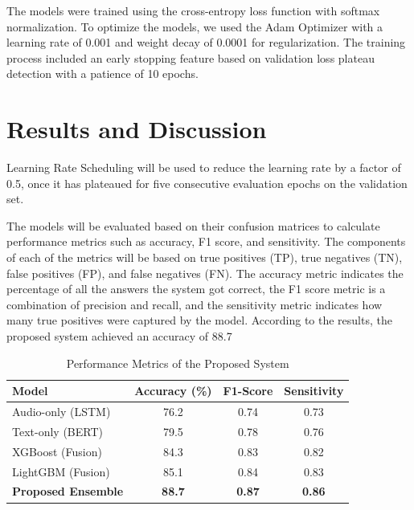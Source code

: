 \documentclass[conference]{IEEEtran}
\begin{document}
The models were trained using the cross-entropy loss function with softmax normalization. To optimize the models, we used the Adam Optimizer\cite{kingma2014adam} with a learning rate of 0.001 and weight decay of 0.0001 for regularization. The training process included an early stopping feature based on validation loss plateau detection with a patience of 10 epochs.

\section{Results and Discussion}

Learning Rate Scheduling will be used to reduce the learning rate by a factor of 0.5, once it has plateaued for five consecutive evaluation epochs on the validation set.

The models will be evaluated based on their confusion matrices to calculate performance metrics such as accuracy, F1 score, and sensitivity. The components of each of the metrics will be based on true positives (TP), true negatives (TN), false positives (FP), and false negatives (FN). The accuracy metric indicates the percentage of all the answers the system got correct, the F1 score metric is a combination of precision and recall, and the sensitivity metric indicates how many true positives were captured by the model. According to the results, the proposed system achieved an accuracy of 88.7%

\begin{table}[htbp]
\caption{Performance Metrics of the Proposed System}
\begin{center}
\begin{tabular}{|l|c|c|c|}
\hline
\textbf{Model} & \textbf{Accuracy (\%)} & \textbf{F1-Score} & \textbf{Sensitivity} \\
\hline
Audio-only (LSTM) & 76.2 & 0.74 & 0.73 \\
Text-only (BERT) & 79.5 & 0.78 & 0.76 \\
XGBoost (Fusion) & 84.3 & 0.83 & 0.82 \\
LightGBM (Fusion) & 85.1 & 0.84 & 0.83 \\
\textbf{Proposed Ensemble} & \textbf{88.7} & \textbf{0.87} & \textbf{0.86} \\
\hline
\end{tabular}
\end{center}
\label{tab:performance}
\end{table}
\end{document}
